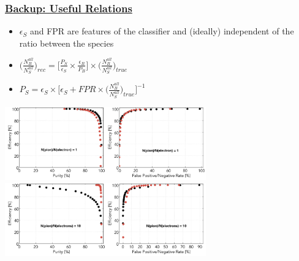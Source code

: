 \documentclass[xcolor=table, xcolor=dvipsnames]{beamer}
\begin{document}
\begin{frame}
  \frametitle{\hyperlink{bup}{Backup: Useful Relations}}
  \label{ratio}
  \footnotesize
  
  
  \begin{itemize}
    \item $\epsilon_S$ and FPR are features of the classifier and (ideally) independent of the ratio between the species
    \item $\Big( \frac{N^{all}_{B}}{N^{all}_{S}} \Big)_{rec} =  \Big[ \frac{P_S}{\epsilon_S} \times \frac{\epsilon_B}{P_B}\Big] \times \Big( \frac{N^{all}_{B}}{N^{all}_{S}} \Big)_{true}$
    \item $P_S = \epsilon_S \times \Big [ \epsilon_S + FPR \times \Big( \frac{N^{all}_{B}}{N^{all}_{S}} \Big)_{true} \Big]^{-1}$
  \end{itemize}
  
  \includegraphics[width=0.65\textwidth]{rocEXR1.png} \\
  \includegraphics[width=0.65\textwidth]{rocEXR01.png}
  
\end{frame}
\end{document}
